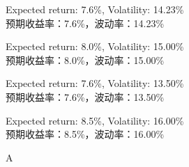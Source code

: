 \documentclass{article}
\begin{document}
    \begin{choices}
        \item Expected return: 7.6\%, Volatility: 14.23\%  \\
        预期收益率：7.6\%，波动率：14.23\%
        \item Expected return: 8.0\%, Volatility: 15.00\%  \\
        预期收益率：8.0\%，波动率：15.00\%
        \item Expected return: 7.6\%, Volatility: 13.50\%  \\
        预期收益率：7.6\%，波动率：13.50\%
        \item Expected return: 8.5\%, Volatility: 16.00\%  \\
        预期收益率：8.5\%，波动率：16.00\%
    \end{choices}

    \begin{correctanswer}
    A
    \end{correctanswer}
    
\end{document}
